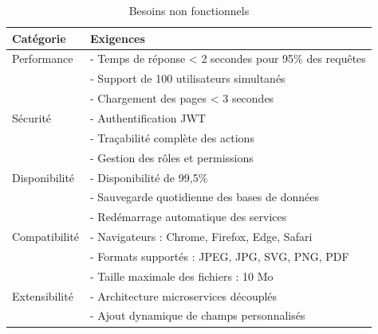 \documentclass[12pt,a4paper]{report}
\begin{document}
\begin{table}[H]

 \centering

 \caption{Besoins non fonctionnels}

 \label{tab:non_fonctionnel}

 \begin{tabular}{|p{3.5cm}|p{10cm}|}

 \hline

 \textbf{Catégorie} & \textbf{Exigences} \\

 \hline

 Performance & - Temps de réponse < 2 secondes pour 95\% des requêtes \\

 & - Support de 100 utilisateurs simultanés \\

 & - Chargement des pages < 3 secondes \\

 \hline

 Sécurité & - Authentification JWT \\

 & - Traçabilité complète des actions \\

 & - Gestion des rôles et permissions \\

 \hline

 Disponibilité & - Disponibilité de 99,5\% \\

 & - Sauvegarde quotidienne des bases de données \\

 & - Redémarrage automatique des services \\

 \hline

 Compatibilité & - Navigateurs : Chrome, Firefox, Edge, Safari \\

 & - Formats supportés : JPEG, JPG, SVG, PNG, PDF \\

 & - Taille maximale des fichiers : 10 Mo \\

 \hline

 Extensibilité & - Architecture microservices découplés \\

 & - Ajout dynamique de champs personnalisés \\


\end{tabular}
\end{table}
\end{document}
